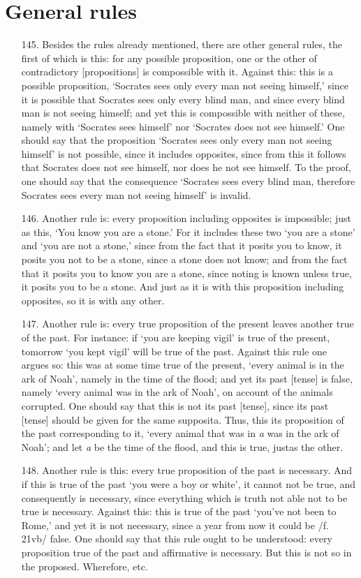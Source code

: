 \documentclass[]{article}
\begin{document}
\section{General rules}
\begin{itemize}
\item[145.] Besides the rules already mentioned, there are other general rules, the first of which is this: for any possible proposition, one or the other of contradictory [propositions] is compossible with it. Against this: this is a possible proposition, `Socrates sees only every man not seeing himself,' since it is possible that Socrates sees only every blind man, and since every blind man is not seeing himself; and yet this is compossible with neither of these, namely with `Socrates sees himself' nor `Socrates does not see himself.' One should say that the proposition `Socrates sees only every man not seeing himself' is not possible, since it includes opposites, since from this it follows that Socrates does not see himself, nor does he not see himself. To the proof, one should say that the consequence `Socrates sees every blind man, therefore Socrates sees every man not seeing himself' is invalid.
\item[146.] Another rule is: every proposition including opposites is impossible; just as this, `You know you are a stone.' For it includes these two `you are a stone' and `you are not a stone,' since from the fact that it posits you to know, it posits you not to be a stone, since a stone does not know; and from the fact that it posits you to know you are a stone, since noting is known unless true, it posits you to be a stone. And just as it is with this proposition including opposites, so it is with any other.
\item[147.] Another rule is: every true proposition of the present leaves another true of the past. For instance: if `you are keeping vigil' is true of the present, tomorrow `you kept vigil' will be true of the past. Against this rule one argues so: this was at some time true of the present, `every animal is in the ark of Noah', namely in the time of the flood; and yet its past [tense] is false, namely `every animal was in the ark of Noah', on account of the animals corrupted. One should say that this is not its past [tense], since its past [tense] should be given for the same supposita. Thus, this its proposition of the past corresponding to it, `every animal that was in \textit{a} was in the ark of Noah'; and let \textit{a} be the time of the flood, and this is true, justas the other.
\item[148.] Another rule is this: every true proposition of the past is necessary. And if this is true of the past `you were a boy or white', it cannot not be true, and consequently is necessary, since everything which is truth not able not to be true is necessary. Against this: this is true of the past `you've not been to Rome,' and yet it is not necessary, since a year from now it could be /f. 21vb/ false. One should say that this rule ought to be understood: every proposition true of the past and affirmative is necessary. But this is not so in the proposed. Wherefore, etc.

\end{itemize}
\end{document}
